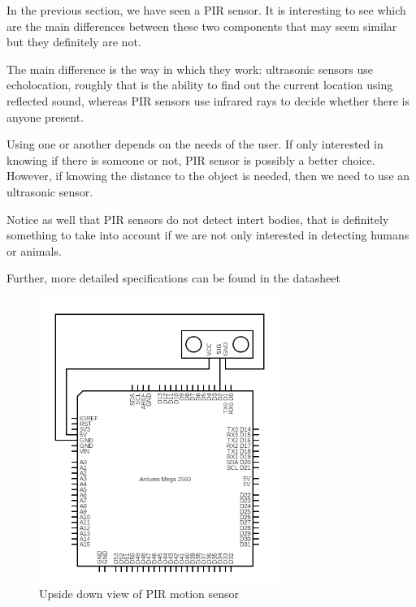 In the previous section, we have seen a PIR sensor. It is interesting to see which are the main differences between these two components that may seem similar but they definitely are not.

	The main difference is the way in which they work: ultrasonic sensors use echolocation\cite{echolocation}, roughly that is the ability to find out the current location using reflected sound, whereas PIR sensors use infrared rays to decide whether there is anyone present.

	Using one or another depends on the needs of the user. If only interested in knowing if there is someone or not, PIR sensor is possibly a better choice. However, if knowing the distance to the object is needed, then we need to use an ultrasonic sensor.

	Notice as well that PIR sensors do not detect intert bodies, that is definitely something to take into account if we are not only interested in detecting humans or animals.

Further, more detailed specifications can be found in the datasheet\cite{ultrasonic-datasheet}
		
\begin{figure}[H]
    \centering
    \includegraphics[width=0.7\textwidth]{fig/ultrasonic-scheme-circuit.png}
    \caption{Upside down view of PIR motion sensor}
    \label{fig:ultrasonic-scheme-circuit}
\end{figure}




